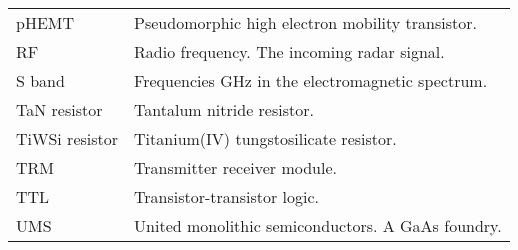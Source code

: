 \begin{tabular}{ l l }
		pHEMT & Pseudomorphic high electron mobility transistor. \\
		RF & Radio frequency. The incoming radar signal. \\
		S band & Frequencies \unit[2--4]{GHz} in the electromagnetic spectrum. \\
		TaN resistor & Tantalum nitride resistor. \\
		TiWSi resistor & Titanium(IV) tungstosilicate resistor. \\
		TRM & Transmitter receiver module. \\
		TTL & Transistor-transistor logic. \\
		UMS & United monolithic semiconductors. A GaAs foundry. \\
	\end{tabular}